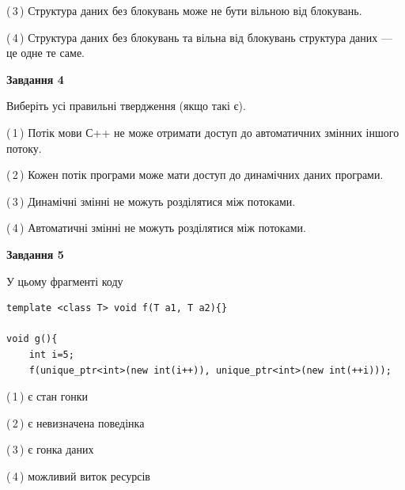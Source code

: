\documentclass[12pt, ukrainian]{article}
\begin{document}
\begin {large}
{(\,3\,) Структура даних без блокувань може не бути вільною від блокувань.%

(\,4\,) Структура даних без блокувань та вільна від блокувань структура даних --- це одне те саме.%



\begin{center}
\textbf{Завдання 4}
\end{center}
Виберіть усі правильні твердження (якщо такі є).\par
\vspace{2mm}

(\,1\,) Потік мови С++ не може отримати доступ до автоматичних змінних іншого потоку.%

(\,2\,) Кожен потік програми може мати доступ до динамічних даних програми.%

(\,3\,) Динамічні змінні не можуть розділятися між потоками.%

(\,4\,) Автоматичні змінні не можуть розділятися між потоками.%



\begin{center}
\textbf{Завдання 5}
\end{center}
У цьому фрагменті коду
\begin{verbatim}
template <class T> void f(T a1, T a2){}

void g(){
    int i=5;
    f(unique_ptr<int>(new int(i++)), unique_ptr<int>(new int(++i)));
\end{verbatim}

(\,1\,) є стан гонки%

(\,2\,) є невизначена поведінка%

(\,3\,) є гонка даних%

(\,4\,) можливий виток ресурсів%


}
\end {large}
\end{document}
